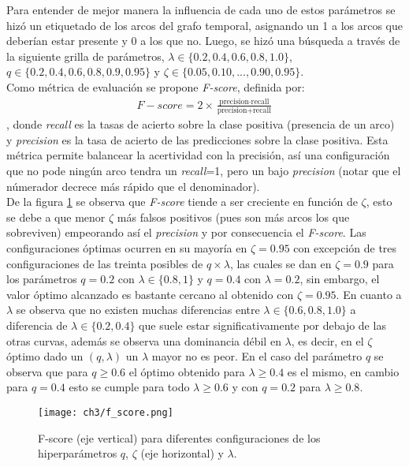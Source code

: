 \documentclass[letterpaper,12pt,oneside]{book} %
\begin{document}
Para entender de mejor manera la influencia de cada uno de estos parámetros se hizó un etiquetado de los arcos del grafo temporal, asignando un 1 a los arcos que deberían estar presente y 0 a los que no. Luego, se hizó una búsqueda a través de la siguiente grilla de parámetros, $\lambda \in \{0.2, 0.4, 0.6, 0.8, 1.0\}$, $q \in \{0.2, 0.4, 0.6, 0.8, 0.9, 0.95\}$ y $\zeta \in \{0.05, 0.10, ..., 0.90, 0.95\}$.\\

Como métrica de evaluación se propone \textit{F-score}, definida por:
\begin{align}
    F-score = 2\times \frac{\text{precision}\cdot \text{recall}}{\text{precision}+\text{recall}}
\end{align}
, donde \textit{recall} es la tasas de acierto sobre la clase positiva (presencia de un arco) y \textit{precision} es la tasa de acierto de las predicciones sobre la clase positiva. Esta métrica permite balancear la acertividad con la precisión, así una configuración que no pode ningún arco tendra un \textit{recall}=1, pero un bajo \textit{precision} (notar que el númerador decrece más rápido que el denominador). \\

De la figura \ref{img:f_score} se observa que \textit{F-score} tiende a ser creciente en función de $\zeta$, esto se debe a que menor $\zeta$ más falsos positivos (pues son más arcos los que sobreviven) empeorando así el \textit{precision} y por consecuencia el \textit{F-score}. Las configuraciones óptimas ocurren en su mayoría en $\zeta=0.95$ con excepción de tres configuraciones de las treinta posibles de $q\times \lambda$, las cuales se dan en $\zeta=0.9$ para los parámetros $q=0.2$ con $\lambda \in \{0.8, 1\}$ y $q=0.4$ con $\lambda=0.2$, sin embargo, el valor óptimo alcanzado es bastante cercano al obtenido con $\zeta=0.95$. En cuanto a $\lambda$ se observa que no existen muchas diferencias entre $\lambda\in\{0.6, 0.8, 1.0\}$ a diferencia de $\lambda \in \{0.2, 0.4\}$ que suele estar significativamente por debajo de las otras curvas, además se observa una dominancia débil en $\lambda$, es decir, en el $\zeta$ óptimo dado un $(q, \lambda)$ un $\lambda$ mayor no es peor. En el caso del parámetro $q$ se observa que para $q\geq 0.6$ el óptimo obtenido para $\lambda\geq 0.4$ es el mismo, en cambio para $q=0.4$ esto se cumple para todo $\lambda\geq 0.6$ y con $q=0.2$ para $\lambda \geq 0.8$. 

\begin{figure}
    \centering
    \texttt{[image: ch3/f\_score.png]}
    \caption{F-score (eje vertical) para diferentes configuraciones de los hiperparámetros $q$, $\zeta$ (eje horizontal) y $\lambda$.}
    \label{img:f_score}
\end{figure}
\end{document}
